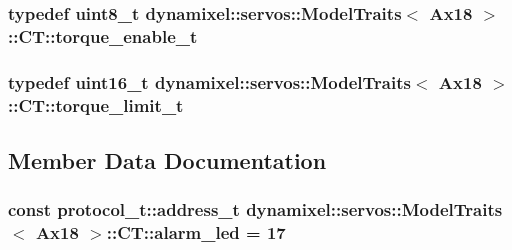 \subsubsection[{\texorpdfstring{torque\+\_\+enable\+\_\+t}{torque_enable_t}}]{\setlength{\rightskip}{0pt plus 5cm}typedef uint8\+\_\+t {\bf dynamixel\+::servos\+::\+Model\+Traits}$<$ {\bf Ax18} $>$\+::{\bf C\+T\+::torque\+\_\+enable\+\_\+t}}\hypertarget{structdynamixel_1_1servos_1_1_model_traits_3_01_ax18_01_4_1_1_c_t_ad7f7f4681a64903f10a75031ccc1ae29}{}\label{structdynamixel_1_1servos_1_1_model_traits_3_01_ax18_01_4_1_1_c_t_ad7f7f4681a64903f10a75031ccc1ae29}
\subsubsection[{\texorpdfstring{torque\+\_\+limit\+\_\+t}{torque_limit_t}}]{\setlength{\rightskip}{0pt plus 5cm}typedef uint16\+\_\+t {\bf dynamixel\+::servos\+::\+Model\+Traits}$<$ {\bf Ax18} $>$\+::{\bf C\+T\+::torque\+\_\+limit\+\_\+t}}\hypertarget{structdynamixel_1_1servos_1_1_model_traits_3_01_ax18_01_4_1_1_c_t_a0e0aa42e2cd42ab34630a10ac4273916}{}\label{structdynamixel_1_1servos_1_1_model_traits_3_01_ax18_01_4_1_1_c_t_a0e0aa42e2cd42ab34630a10ac4273916}


\subsection{Member Data Documentation}
\subsubsection[{\texorpdfstring{alarm\+\_\+led}{alarm_led}}]{\setlength{\rightskip}{0pt plus 5cm}const {\bf protocol\+\_\+t\+::address\+\_\+t} {\bf dynamixel\+::servos\+::\+Model\+Traits}$<$ {\bf Ax18} $>$\+::C\+T\+::alarm\+\_\+led = 17\hspace{0.3cm}{\ttfamily [static]}}\hypertarget{structdynamixel_1_1servos_1_1_model_traits_3_01_ax18_01_4_1_1_c_t_a702dbaacf0460680c18524e61e02f883}{}\label{structdynamixel_1_1servos_1_1_model_traits_3_01_ax18_01_4_1_1_c_t_a702dbaacf0460680c18524e61e02f883}
